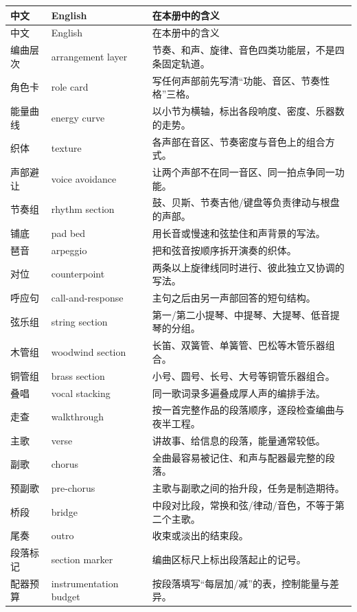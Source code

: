 \begin{longtable}{p{}p{}p{}}
\toprule
中文 & English & 在本册中的含义 \\
\midrule
\endfirsthead
\toprule
中文 & English & 在本册中的含义 \\
\midrule
\endhead
编曲层次 & arrangement layer & 节奏、和声、旋律、音色四类功能层，不是四条固定轨道。 \\
角色卡 & role card & 写任何声部前先写清“功能、音区、节奏性格”三格。 \\
能量曲线 & energy curve & 以小节为横轴，标出各段响度、密度、乐器数的走势。 \\
织体 & texture & 各声部在音区、节奏密度与音色上的组合方式。 \\
声部避让 & voice avoidance & 让两个声部不在同一音区、同一拍点争同一功能。 \\
节奏组 & rhythm section & 鼓、贝斯、节奏吉他/键盘等负责律动与根盘的声部。 \\
铺底 & pad bed & 用长音或慢速和弦垫住和声背景的写法。 \\
琶音 & arpeggio & 把和弦音按顺序拆开演奏的织体。 \\
对位 & counterpoint & 两条以上旋律线同时进行、彼此独立又协调的写法。 \\
呼应句 & call-and-response & 主句之后由另一声部回答的短句结构。 \\
弦乐组 & string section & 第一/第二小提琴、中提琴、大提琴、低音提琴的分组。 \\
木管组 & woodwind section & 长笛、双簧管、单簧管、巴松等木管乐器组合。 \\
铜管组 & brass section & 小号、圆号、长号、大号等铜管乐器组合。 \\
叠唱 & vocal stacking & 同一歌词录多遍叠成厚人声的编排手法。 \\
走查 & walkthrough & 按一首完整作品的段落顺序，逐段检查编曲与夜半工程。 \\
主歌 & verse & 讲故事、给信息的段落，能量通常较低。 \\
副歌 & chorus & 全曲最容易被记住、和声与配器最完整的段落。 \\
预副歌 & pre-chorus & 主歌与副歌之间的抬升段，任务是制造期待。 \\
桥段 & bridge & 中段对比段，常换和弦/律动/音色，不等于第二个主歌。 \\
尾奏 & outro & 收束或淡出的结束段。 \\
段落标记 & section marker & 编曲区标尺上标出段落起止的记号。 \\
配器预算 & instrumentation budget & 按段落填写“每层加/减”的表，控制能量与差异。 \\

\end{longtable}
